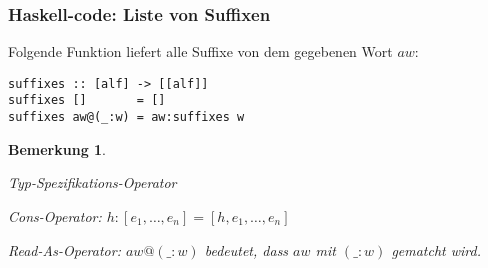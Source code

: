 \documentclass{beamer}
\newtheorem{remark}{Bemerkung}
\begin{document}
\begin{frame}[fragile]
\frametitle{Haskell-code: Liste von Suffixen}
Folgende Funktion liefert alle Suffixe von dem gegebenen Wort $aw$:
\begin{lstlisting}
suffixes :: [alf] -> [[alf]]
suffixes []       = []
suffixes aw@(_:w) = aw:suffixes w
\end{lstlisting}
\bigskip
\begin{remark}
\begin{description}[l]
    \item[Operator $(::)$] Typ-Spezifikations-Operator
    \item[Operator $(:)$] Cons-Operator: $h:[e_1, \dots, e_n] = [h, e_1, \dots, e_n]$
    \item[Operator $(@)$] Read-As-Operator: $aw@(\_:w)$ bedeutet, dass $aw$ mit $(\_:w)$ gematcht wird.
\end{description}
\end{remark}
\end{frame}
\end{document}

